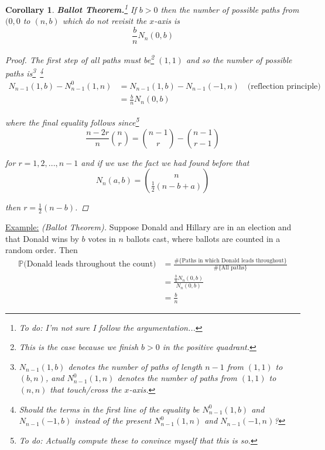\documentclass[12pt]{article}
\newtheorem{corollary}{Corollary}
\renewcommand{\P}{\mathbb P}
\begin{document}
\begin{corollary} {\bf Ballot Theorem.}\footnote{To do: I'm not sure I follow the argumentation...} If $b > 0$ then the number of possible paths from $(0,0$ to $(n,b)$ which do not revisit the $x$-axis is
\begin{equation*}
	\frac{b}{n} N_n(0,b)
\end{equation*}

\begin{proof} The first step of all paths must be\footnote{This is the case because we finish $b > 0$ in the positive quadrant.} $(1,1)$ and so the number of possible paths is\footnote{$N_{n - 1}(1,b)$ denotes the number of paths of length $n - 1$ from $(1, 1)$ to $(b, n)$, and $N^0_{n - 1}(1, n)$ denotes the number of paths from $(1,1)$ to $(n,n)$ that touch/cross the $x$-axis.}~\footnote{Should the terms in the first line of the equality be $N^0_{n - 1}(1,b)$ and $N_{n - 1}(-1,b)$ instead of the present $N^0_{n - 1}(1,n)$ and $N_{n - 1}(-1,n)$?}
\begin{align*}
	N_{n - 1}(1,b) - N^0_{n - 1}(1,n) &= N_{n - 1}(1, b) - N_{n - 1}(-1, n) \quad \text{(reflection principle)} \\
	&= \frac{b}{n}N_n(0,b)
\end{align*}

where the final equality follows since\footnote{To do: Actually compute these to convince myself that this is so.}
\begin{equation*}
	\frac{n - 2r}{n}{{n}\choose{r}} = {{n - 1}\choose{r}} - {{n - 1}\choose{r - 1}}
\end{equation*}

for $r = 1,2,...,n-1$ and if we use the fact we had found before that
\begin{equation*}
	N_n(a,b) = {{n}\choose{\frac{1}{2}(n - b + a)}}
\end{equation*}

then $r = \frac{1}{2}(n - b)$.
\end{proof}
\end{corollary}

\underline{Example:} {\em (Ballot Theorem).} Suppose Donald and Hillary are in an election and that Donald wins by $b$ votes in $n$ ballots cast, where ballots are counted in a random order. Then
\begin{align*}
	\P(\text{Donald leads throughout the count)} &= \frac{ \#\{\text{Paths in which Donald leads throughout}\} } { \#\{\text{All paths}\} } \\
	&= \frac{ \frac{b}{n} N_n(0,b) }{  N_n(0,b)} \\
	&= \frac{b}{n}
\end{align*}
\end{document}
